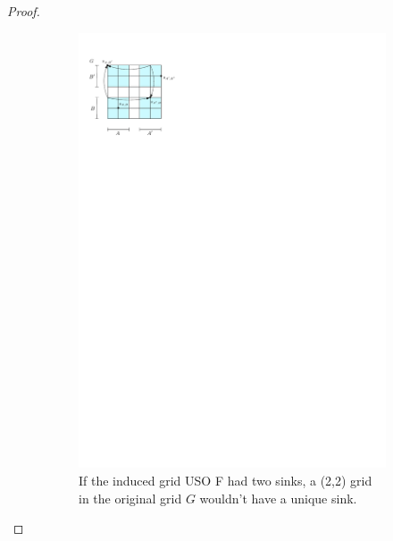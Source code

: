 \documentclass[a4paper,10pt]{article}
\begin{document}
\begin{proof}
\begin{figure}
\begin{subfigure}[t]{0.45\textwidth}
\includegraphics{product_lemma_two_sinks.pdf}
\caption{\small If the induced grid USO F had two sinks, a (2,2) grid in the original grid $G$ wouldn't have a unique sink.}
\label{fig:InducedUSOtwosinks}
\end{subfigure}
\qquad\qquad
\begin{subfigure}[t]{0.45\textwidth}

\end{subfigure}
\end{figure}
\end{proof}
\end{document}
